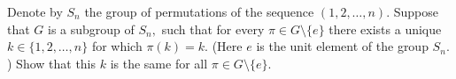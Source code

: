 Denote by $S_n$ the group of permutations of the sequence $(1,2,\dots,n).$ Suppose that $G$ is a subgroup of $S_n,$ such that for every $\pi\in G\setminus\{e\}$ there exists a unique $k\in \{1,2,\dots,n\}$ for which $\pi(k)=k.$ (Here $e$ is the unit element of the group $S_n.$) Show that this $k$ is the same for all $\pi \in G\setminus \{e\}.$